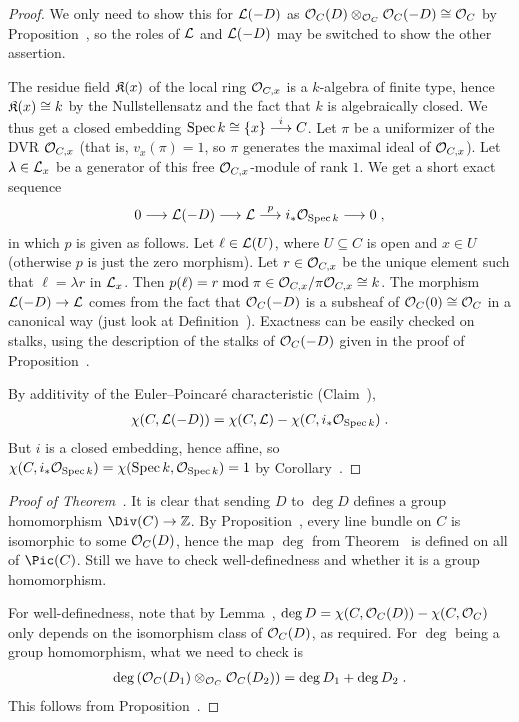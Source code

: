 \documentclass[a4paper,parskip=half,numbers=enddot, DIV=12]{scrreprt}
\begin{document}
\begin{proof}
	We only need to show this for $\mathcal{L}(-D)$ as $\mathcal{O}_C(D)\otimes_{\mathcal{O}_C}\mathcal{O}_C(-D)\cong \mathcal{O}_C$ by Proposition~, so the roles of $\mathcal{L}$ and $\mathcal{L}(-D)$ may  be switched to show the other assertion.
	
	The residue field $\mathfrak{K}(x)$ of the local ring $\mathcal{O}_{C,x}$ is a $k$-algebra of finite type, hence $\mathfrak{K}(x)\cong k$ by the Nullstellensatz and the fact that $k$ is algebraically closed. We thus get a closed embedding $\Spec k\cong\{x\}\morphism[i]C$. Let $\pi$ be a uniformizer of the DVR $\mathcal{O}_{C,x}$ (that is, $v_x(\pi)=1$, so $\pi$ generates the maximal ideal of $\mathcal{O}_{C,x}$). Let $\lambda\in\mathcal{L}_x$ be a generator of this free $\mathcal{O}_{C,x}$-module of rank $1$. We get a short exact sequence
	\begin{align*}
	0\morphism\Ll(-D)\morphism\Ll\morphism[p]i_*\Oo_{\Spec k}\morphism 0\;,
	\end{align*}
	in which $p$ is given as follows. Let $\ell\in\mathcal{L}(U)$, where $U\subseteq C$ is open and $x\in U$ (otherwise $p$ is just the zero morphism). Let $r\in\mathcal{O}_{C,x}$ be the unique element such that $\ell=\lambda r$ in $\mathcal{L}_x$. Then $p(\ell)=r\bmod \pi\in\mathcal{O}_{C,x}/\pi\mathcal{O}_{C,x}\cong k$. The morphism $\Ll(-D)\morphism\Ll$ comes from the fact that $\mathcal{O}_C(-D)$ is a subsheaf of $\mathcal{O}_C(0)\cong \mathcal{O}_C$ in a canonical way (just look at Definition~). Exactness can be easily checked on stalks, using the description of the stalks of $\mathcal{O}_C(-D)$ given in the proof of Proposition~. 
	
	By additivity of the Euler--Poincaré characteristic (Claim~), 
	\begin{align*}
	\chi(C,\mathcal{L}(-D))=\chi(C,\mathcal{L})-\chi(C,i_*\mathcal{O}_{\operatorname{Spec} k})\;.
	\end{align*}
	But $i$ is a closed embedding, hence affine, so $\chi(C,i_*\mathcal{O}_{\operatorname{Spec} k})=\chi(\operatorname{Spec} k,\mathcal{O}_{\operatorname{Spec} k})=1$ by Corollary~.
\end{proof}
\begin{proof}[Proof of Theorem~]
	It is clear that sending $D$ to $\deg D$ defines a group homomorphism $\Div(C)\morphism\IZ$. By Proposition~, every line bundle on $C$ is isomorphic to some $\mathcal{O}_C(D)$, hence the map $\deg$ from Theorem~ is defined on all of $\Pic(C)$. Still we have to check well-definedness and whether it is a group homomorphism.
	
	For well-definedness, note that by Lemma~, $\deg D=\chi(C,\mathcal{O}_C(D))-\chi(C,\mathcal{O}_C)$ only depends on the isomorphism class of $\mathcal{O}_C(D)$, as required. For $\deg$ being a group homomorphism, what we need to check is 
	\begin{align*}
	\deg\left(\mathcal{O}_C(D_1)\otimes_{\mathcal{O}_C}\mathcal{O}_C(D_2)\right)=\deg D_1+\deg D_2\;.
	\end{align*}
	This follows from Proposition~.
\end{proof}
\end{document}
